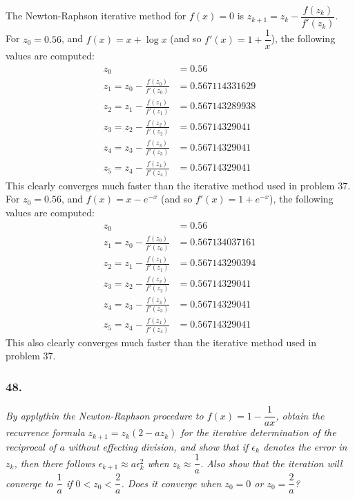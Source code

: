\documentclass[12pt]{article}
\begin{document}
\noindent The Newton-Raphson iterative method for $f(x) = 0$ is $z_{k+1} = z_k - \dfrac{f(z_k)}{f'(z_k)}$.  For $z_0 = 0.56$, and $f(x) = x + \log{x}$ \Big(and so $f'(x) = 1 + \dfrac{1}{x}$\Big), the following values are computed:
\begin{align*}
z_0 &= 0.56 \\
z_1 = z_0 - \frac{f(z_0)}{f'(z_0)} &= 0.567114331629 \\
z_2 = z_1 - \frac{f(z_1)}{f'(z_1)} &=  0.567143289938 \\
z_3 = z_2 - \frac{f(z_2)}{f'(z_2)} &=  0.56714329041 \\
z_4 = z_3 - \frac{f(z_3)}{f'(z_3)} &=  0.56714329041 \\
z_5 = z_4 - \frac{f(z_4)}{f'(z_4)} &=  0.56714329041
\end{align*}
This clearly converges much faster than the iterative method used in problem 37.  For $z_0 = 0.56$, and $f(x) = x - e^{-x}$ (and so $f'(x) = 1 + e^{-x}$), the following values are computed:
\begin{align*}
z_0 &= 0.56 \\
z_1 = z_0 - \frac{f(z_0)}{f'(z_0)} &= 0.567134037161 \\
z_2 = z_1 - \frac{f(z_1)}{f'(z_1)} &=  0.567143290394 \\
z_3 = z_2 - \frac{f(z_2)}{f'(z_2)} &=  0.56714329041 \\
z_4 = z_3 - \frac{f(z_3)}{f'(z_3)} &=  0.56714329041 \\
z_5 = z_4 - \frac{f(z_4)}{f'(z_4)} &=  0.56714329041
\end{align*}
This also clearly converges much faster than the iterative method used in problem 37.

\subsubsection*{48.}
{\it By applythin the Newton-Raphson procedure to $f(x) = 1 - \dfrac{1}{ax}$, obtain the recurrence formula $z_{k+1} = z_k(2 - az_k)$ for the iterative determination of the reciprocal of $a$ without effecting division, and show that if $\epsilon_k$ denotes the error in $z_k$, then there follows $\epsilon_{k+1} \approx a\epsilon_k^2$ when $z_k \approx \dfrac{1}{a}$.  Also show that the iteration will converge to $\dfrac{1}{a}$ if $0 < z_0 < \dfrac{2}{a}$.  Does it converge when $z_0 = 0$ or $z_0 = \dfrac{2}{a}$?}\\
\end{document}

